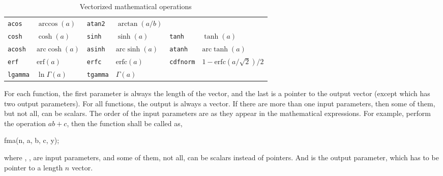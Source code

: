 \begin{table}[ht]
\begin{tabu}{X[l]X[2l]X[l]X[2l]X[l]X[2l]}
    \texttt{acos}    & $\arccos(a)$                          &
    \texttt{atan2}   & $\arctan(a / b)$                      \\
    \texttt{cosh}    & $\cosh(a)$                            &
    \texttt{sinh}    & $\sinh(a)$                            &
    \texttt{tanh}    & $\tanh(a)$                            \\
    \texttt{acosh}   & $\mathrm{arc}\cosh(a)$                &
    \texttt{asinh}   & $\mathrm{arc}\sinh(a)$                &
    \texttt{atanh}   & $\mathrm{arc}\tanh(a)$                \\
    \texttt{erf}     & $\mathrm{erf}(a)$                     &
    \texttt{erfc}    & $\mathrm{erfc}(a)$                    &
    \texttt{cdfnorm} & $1 - \mathrm{erfc}(a / \sqrt{2}) / 2$ \\
    \texttt{lgamma}  & $\ln\Gamma(a)$                        &
    \texttt{tgamma}  & $\Gamma(a)$                           &
                     &                                       \\
    \bottomrule
  \end{tabu}
  \caption{Vectorized mathematical operations}
  \label{tab:Vectorized mathematical operations}
\end{table}

For each function, the first parameter is always the length of
the vector, and the last is a pointer to the output vector (except
 which has two output parameters). For all functions, the
output is always a vector. If there are more than one input parameters, then
some of them, but not all, can be scalars. The order of the input parameters
are as they appear in the mathematical expressions. For example,
 perform the operation $ab + c$, then the function shall be
called as,
\begin{cppcode}
  fma(n, a, b, c, y);
\end{cppcode}
where , ,  are input parameters, and
some of them, not all, can be scalars instead of pointers. And  is
the output parameter, which has to be pointer to a length $n$ vector.
